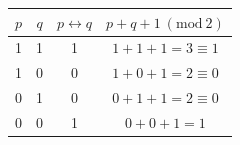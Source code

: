 \begin{table}[h!]
\centering
\begin{tabular}{cccc}
\hline
$p$ & $q$ & $p \leftrightarrow q$ & $p+q+1 \ (\mathrm{mod}\ 2)$ \\
\hline
1 & 1 & 1 & $1+1+1=3\equiv1$ \\
1 & 0 & 0 & $1+0+1=2\equiv0$ \\
0 & 1 & 0 & $0+1+1=2\equiv0$ \\
0 & 0 & 1 & $0+0+1=1$ \\
\hline
\end{tabular}
\end{table}
